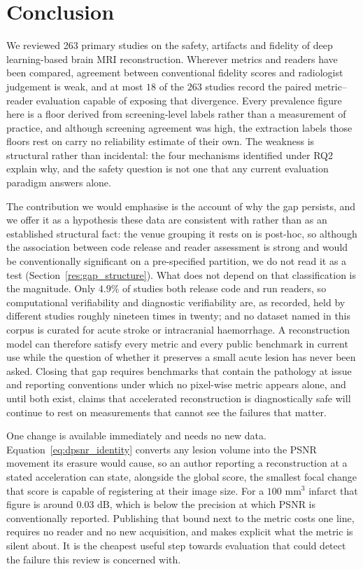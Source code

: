 \documentclass[review,authoryear]{elsarticle}
\begin{document}
\section{Conclusion}
\label{sec:conclusion}

We reviewed 263 primary studies on the safety, artifacts and fidelity of deep
learning-based brain MRI reconstruction. Wherever metrics and readers have been compared, agreement between conventional fidelity scores and radiologist judgement is weak, and at most $18$ of the $263$ studies record the paired metric--reader evaluation capable of exposing that divergence. Every prevalence figure here is a floor derived from screening-level labels rather than a measurement of practice, and although screening agreement was high, the extraction labels those floors rest on carry no reliability estimate of their own. The weakness is structural rather than incidental: the four mechanisms identified under RQ2 explain why, and the safety question is not one that any current evaluation paradigm answers alone.

The contribution we would emphasise is the account of why the gap persists, and we
offer it as a hypothesis these data are consistent with rather than as an established
structural fact: the venue grouping it rests on is post-hoc, so although the association
between code release and reader assessment is strong and would be conventionally
significant on a pre-specified partition, we do not read it as a test
(Section~\ref{res:gap_structure}). What does not depend on that classification is the
magnitude. Only $4.9\%$ of studies both release code and run readers, so computational
verifiability and diagnostic verifiability are, as recorded, held by different studies
roughly nineteen times in twenty; and no dataset named in this corpus is curated for
acute stroke or intracranial haemorrhage. A reconstruction model can
therefore satisfy every metric and every public benchmark in current use while the
question of whether it preserves a small acute lesion has never been asked. Closing that
gap requires benchmarks that contain the pathology at issue and reporting conventions
under which no pixel-wise metric appears alone, and until both exist, claims that
accelerated reconstruction is diagnostically safe will continue to rest on measurements
that cannot see the failures that matter.

One change is available immediately and needs no new data. Equation~\eqref{eq:dpsnr_identity}
converts any lesion volume into the PSNR movement its erasure would cause, so an author
reporting a reconstruction at a stated acceleration can state, alongside the global
score, the smallest focal change that score is capable of registering at their image
size. For a $100\text{ mm}^3$ infarct that figure is around $0.03\text{ dB}$, which is
below the precision at which PSNR is conventionally reported. Publishing that bound next
to the metric costs one line, requires no reader and no new acquisition, and makes
explicit what the metric is silent about. It is the cheapest useful step towards
evaluation that could detect the failure this review is concerned with.
\end{document}
